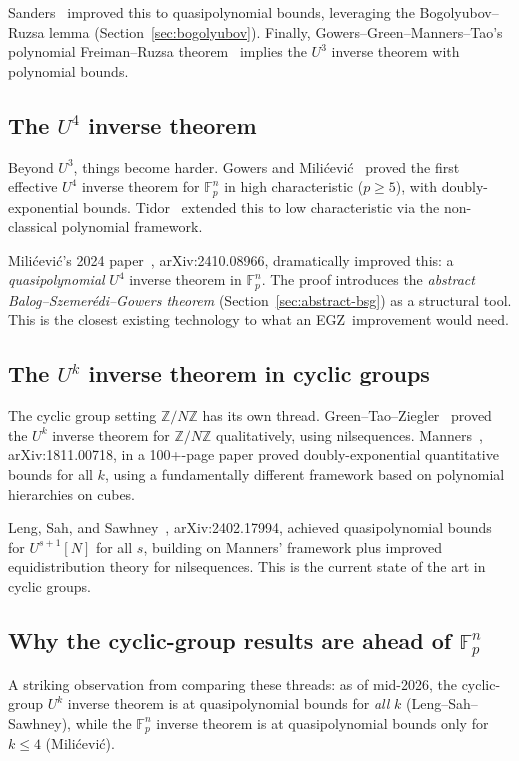 \documentclass[11pt,a4paper]{article}
\theoremstyle{plain}
\theoremstyle{definition}
\theoremstyle{remark}
\newcommand{\F}{\mathbb{F}}
\newcommand{\Z}{\mathbb{Z}}
\newcommand{\EGZ}{\textsf{EGZ}}
\begin{document}
Sanders~\cite{sanders2012} improved this to quasipolynomial bounds, leveraging the Bogolyubov--Ruzsa lemma (Section~\ref{sec:bogolyubov}). Finally, Gowers--Green--Manners--Tao's polynomial Freiman--Ruzsa theorem~\cite{ggmt2023} implies the $U^3$ inverse theorem with polynomial bounds.

\subsection{The $U^4$ inverse theorem}

Beyond $U^3$, things become harder. Gowers and Milićević~\cite{gowersmilicevic2017} proved the first effective $U^4$ inverse theorem for $\F_p^n$ in high characteristic ($p \geq 5$), with doubly-exponential bounds. Tidor~\cite{tidor2021} extended this to low characteristic via the non-classical polynomial framework.

Milićević's 2024 paper~\cite{milicevic2024}, arXiv:2410.08966, dramatically improved this: a \emph{quasipolynomial} $U^4$ inverse theorem in $\F_p^n$. The proof introduces the \emph{abstract Balog--Szemer\'edi--Gowers theorem} (Section~\ref{sec:abstract-bsg}) as a structural tool. This is the closest existing technology to what an \EGZ\ improvement would need.

\subsection{The $U^k$ inverse theorem in cyclic groups}

The cyclic group setting $\Z/N\Z$ has its own thread. Green--Tao--Ziegler~\cite{greentaoziegler2012} proved the $U^k$ inverse theorem for $\Z/N\Z$ qualitatively, using nilsequences. Manners~\cite{manners2018}, arXiv:1811.00718, in a 100+-page paper proved doubly-exponential quantitative bounds for all $k$, using a fundamentally different framework based on polynomial hierarchies on cubes.

Leng, Sah, and Sawhney~\cite{lengsahsawhney2024}, arXiv:2402.17994, achieved quasipolynomial bounds for $U^{s+1}[N]$ for all $s$, building on Manners' framework plus improved equidistribution theory for nilsequences. This is the current state of the art in cyclic groups.

\subsection{Why the cyclic-group results are ahead of $\F_p^n$}

A striking observation from comparing these threads: as of mid-2026, the cyclic-group $U^k$ inverse theorem is at quasipolynomial bounds for \emph{all} $k$ (Leng--Sah--Sawhney), while the $\F_p^n$ inverse theorem is at quasipolynomial bounds only for $k \leq 4$ (Milićević).
\end{document}

